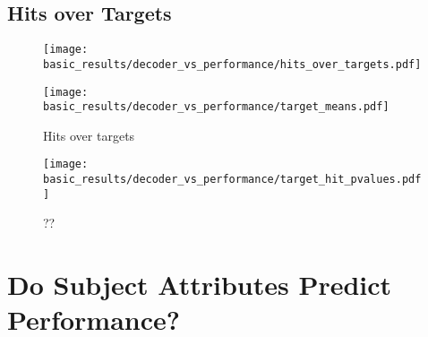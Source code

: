 \documentclass[../main.tex]{subfiles}
\begin{document}
\subsection{Hits over Targets}

\begin{figure}[H]
    \centering
    \begin{minipage}{0.49\textwidth}
        \texttt{[image: basic\_results/decoder\_vs\_performance/hits\_over\_targets.pdf]}
        \subcaption{}
    \end{minipage}
    \begin{minipage}{0.49\textwidth}
        \texttt{[image: basic\_results/decoder\_vs\_performance/target\_means.pdf]}
      \subcaption{}
    \end{minipage}
    \caption[Hits over targets]{Hits over targets}\label{fig:hits_over_targets}
\end{figure}


\begin{figure}[H]
    \centering
    \texttt{[image: basic\_results/decoder\_vs\_performance/target\_hit\_pvalues.pdf]}
    \caption[Target hit Tukey test]{??}\label{fig:target_hit_pvalues}
\end{figure}



% 



\section{Do Subject Attributes Predict Performance?}
\end{document}
